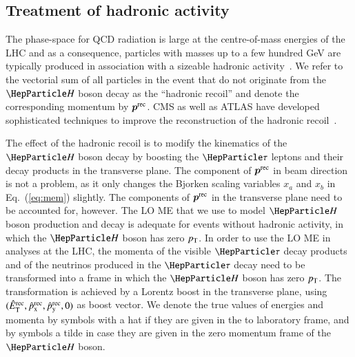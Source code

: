 \subsection{Treatment of hadronic activity}
\label{sec:mem_hadRecoil}

The phase-space for QCD radiation is large at the centre-of-mass
energies of the LHC
and as a consequence, particles with masses up to a few hundred GeV 
are typically produced in association with a sizeable hadronic activity~\cite{Alwall:2010cq}.
We refer to the vectorial sum of all particles in the event that do not originate from the $\PHiggs$ boson decay
as the ``hadronic recoil'' and denote the corresponding momentum by $\bm{p}^{\textrm{rec}}$.
CMS as well as ATLAS have developed sophisticated techniques to improve the reconstruction 
of the hadronic recoil~\cite{CMS-JME-13-003,ATLAS-CONF-2014-019}.

The effect of the hadronic recoil is to modify the kinematics of the $\PHiggs$ boson decay
by boosting the $\Pgt$ leptons and their decay products in the transverse plane.
The component of $\bm{p}^{\textrm{rec}}$ in beam direction is not a problem, 
as it only changes the Bjorken scaling variables $x_{a}$ and $x_{b}$ in Eq.~(\ref{eq:mem}) slightly.
The components of $\bm{p}^{\textrm{rec}}$ in the transverse plane need to be accounted for, however.
The LO ME that we use to model $\PHiggs$ boson production and decay
is adequate for events without hadronic activity,
in which the $\PHiggs$ boson has zero $p_{\textrm{T}}$.
In order to use the LO ME in analyses at the LHC,
the momenta of the visible $\Pgt$ decay products and of the neutrinos produced in the $\Pgt$ decay
need to be transformed into a frame in which the $\PHiggs$ boson has zero $p_{\textrm{T}}$.
The transformation is achieved by a Lorentz boost in the transverse plane,
using $(\hat{E}_{\textrm{T}}^{\textrm{rec}}, \hat{p}_{\textrm{x}}^{\textrm{rec}}, \hat{p}_{\textrm{y}}^{\textrm{rec}}, 0)$ as boost
vector.
We denote the true values of energies and momenta by symbols with a
hat if they are given in the to laboratory frame, and by symbols a tilde in case they are given in the zero momentum frame of the $\PHiggs$ boson.

